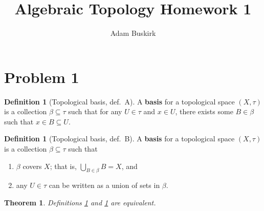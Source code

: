 \documentclass{article}
\title{Algebraic Topology Homework 1}
\author{Adam Buskirk}
\newtheorem{theorem}[subsection]{Theorem}
\theoremstyle{definition}
\newtheorem{definition}[subsection]{Definition}
\begin{document}
\maketitle
\section{Problem 1}
\begin{definition}[Topological basis, def.\ A]\label{topbasisA}
A \textbf{basis} for a topological space $(X,\tau)$ is a collection $\beta \subseteq \tau$ 
such that for any $U \in \tau$ and $x \in U$, there exists some $B \in \beta$ such that
$x \in B \subseteq U$.
\end{definition}
\begin{definition}[Topological basis, def.\ B]\label{topbasisB}
A \textbf{basis} for a topological space $(X,\tau)$ is a collection $\beta \subseteq \tau$ such that
\begin{enumerate}
\item $\beta$ covers $X$; that is, $\bigcup_{B \in \beta} B = X$, and
\item any $U \in \tau$ can be written as a union of sets in $\beta$.
\end{enumerate}
\end{definition}
\begin{theorem}
Definitions \ref{topbasisA} and \ref{topbasisB} are equivalent.
\end{theorem}
\end{document}

